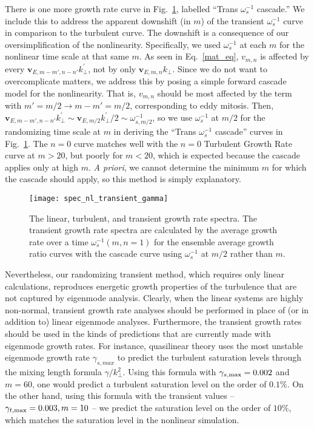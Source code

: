 \documentclass[showpacs,preprintnumbers,amsmath,amssymb,superscriptaddress,aip]{revtex4-1}
\begin{document}
There is one more growth rate curve in Fig.~\ref{spec_nl_transient_gamma}, labelled ``Trans $\omega_s^{-1}$ cascade.'' We include this to address the apparent downshift (in $m$) of
the transient $\omega_s^{-1}$ curve in comparison to the turbulent curve. The downshift is a consequence of our oversimplification of the nonlinearity. Specifically, we
used $\omega_s^{-1}$ at each $m$ for the nonlinear time scale at that same $m$. As seen in Eq.~\ref{mat_eq}, $v_{m,n}$ is affected by every $\mathbf{v}_{E,m-m',n-n'} k^{'}_\perp$, not by only
$\mathbf{v}_{E,m,n} k_\perp$. Since we do not want to overcomplicate matters, we address this by posing a simple forward cascade model for the nonlinearity. That is, $v_{m,n}$ should be
most affected by the term with $m' = m/2 \rightarrow m-m' = m/2$, corresponding to eddy mitosis. Then, $\mathbf{v}_{E,m-m',n-n'} k^{'}_\perp \sim \mathbf{v}_{E,m/2} k^{'}_\perp/2 \sim \omega_{s,m/2}^{-1}$, 
so we use $\omega_s^{-1}$ at $m/2$ for the randomizing time scale at $m$ in deriving the ``Trans $\omega_s^{-1}$ cascade'' curves in Fig.~\ref{spec_nl_transient_gamma}. 
The $n=0$ curve matches well with the $n=0$ Turbulent Growth Rate curve at $m>20$, but poorly for $m<20$, which is expected because the cascade applies only at high $m$. \emph{A priori}, we
cannot determine the minimum $m$ for which the cascade should apply, so this method is simply explanatory.

\begin{figure}
\centerline{\texttt{[image: spec\_nl\_transient\_gamma]}}
\caption{The linear, turbulent, and transient growth rate spectra. The transient growth rate spectra are calculated by the average growth rate over a time $\omega_s^{-1}(m,n=1)$ for the ensemble average
growth ratio curves with the cascade curve using $\omega_s^{-1}$ at $m/2$ rather than $m$.}
\label{spec_nl_transient_gamma}
\end{figure}

Nevertheless, our randomizing transient method, which requires only linear calculations, reproduces energetic growth properties of the turbulence that are not captured by eigenmode analysis.
Clearly, when the linear systems are highly non-normal, transient growth rate analyses should be performed in place of (or in addition to) linear eigenmode analyses. 
Furthermore, the transient growth rates should be used in the kinds of predictions that are currently made with eigenmode growth rates. 
For instance, quasilinear theory uses the most unstable eigenmode growth rate $\gamma_{s,max}$ to predict the turbulent saturation levels through the mixing length formula $\gamma/k_\perp^2$. 
Using this formula with $\gamma_{s,\rm{max}} = 0.002$ and $m=60$, one would predict a turbulent saturation level on the order of $0.1 \%$. 
On the other hand, using this formula with the transient values -- $\gamma_{t,\rm{max}} = 0.003, m=10$ -- we predict the saturation level on the order of $10 \%$,
which matches the saturation level in the nonlinear simulation.
\end{document}
